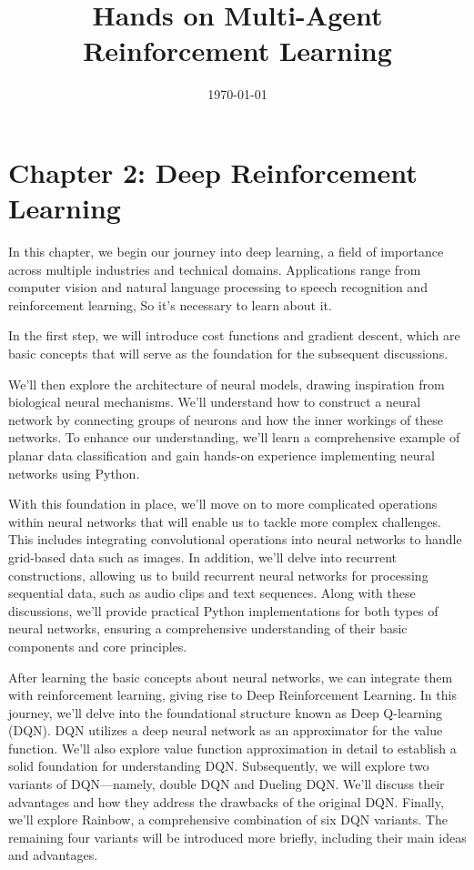 \documentclass{article}
\begin{document}
	
	\title{Hands on Multi-Agent Reinforcement Learning}
	
	\date{\today}
	
	\maketitle
	
	\tableofcontents  %
	\clearpage  %

	\newpage
	\section{Chapter 2: Deep Reinforcement Learning }
    \setcounter{section}{2}

    In this chapter, we begin our journey into deep learning, a field of importance across multiple industries and technical domains. Applications range from computer vision and natural language processing to speech recognition and reinforcement learning, So it's necessary to learn about it.

In the first step, we will introduce cost functions and gradient descent, which are basic concepts that will serve as the foundation for the subsequent discussions.

We'll then explore the architecture of neural models, drawing inspiration from biological neural mechanisms. We'll understand how to construct a neural network by connecting groups of neurons and how the inner workings of these networks. To enhance our understanding, we'll learn a comprehensive example of planar data classification and gain hands-on experience implementing neural networks using Python.

With this foundation in place, we'll move on to more complicated operations within neural networks that will enable us to tackle more complex challenges. This includes integrating convolutional operations into neural networks to handle grid-based data such as images. In addition, we'll delve into recurrent constructions, allowing us to build recurrent neural networks for processing sequential data, such as audio clips and text sequences. Along with these discussions, we'll provide practical Python implementations for both types of neural networks, ensuring a comprehensive understanding of their basic components and core principles.

After learning the basic concepts about neural networks, we can integrate them with reinforcement learning, giving rise to Deep Reinforcement Learning. In this journey, we'll delve into the foundational structure known as Deep Q-learning (DQN). DQN utilizes a deep neural network as an approximator for the value function. We'll also explore value function approximation in detail to establish a solid foundation for understanding DQN. Subsequently, we will explore two variants of DQN—namely, double DQN and Dueling DQN. We'll discuss their advantages and how they address the drawbacks of the original DQN. Finally, we'll explore Rainbow, a comprehensive combination of six DQN variants. The remaining four variants will be introduced more briefly, including their main ideas and advantages.
\end{document}
